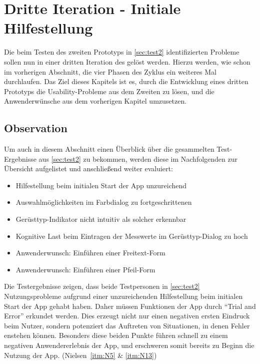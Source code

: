 \chapter{Dritte Iteration - Initiale Hilfestellung}\label{chap:pro3}
Die beim Testen des zweiten Prototyps in \autoref{sec:test2} identifizierten Probleme sollen nun in einer dritten Iteration des \hcdp{} gelöst werden.
Hierzu werden, wie schon im vorherigen Abschnitt, die vier Phasen des Zyklus ein weiteres Mal durchlaufen.
Das Ziel dieses Kapitels ist es, durch die Entwicklung eines dritten Prototyps die Usability-Probleme aus dem Zweiten zu lösen, und die Anwenderwünsche aus dem vorherigen Kapitel umzusetzen.

\section{Observation}\label{sec:obs3}
Um auch in diesem Abschnitt einen Überblick über die gesammelten Test-Ergebnisse aus \autoref{sec:test2} zu bekommen, werden diese im Nachfolgenden zur Übersicht aufgelistet und anschließend weiter evaluiert:

\begin{itemize}
  \item Hilfestellung beim initialen Start der App unzureichend
  \item Auswahlmöglichkeiten im Farbdialog zu fortgeschrittenen
  \item Gerüsttyp-Indikator nicht intuitiv als solcher erkennbar
  \item Kognitive Last beim Eintragen der Messwerte im Gerüsttyp-Dialog zu hoch
  \item Anwenderwunsch: Einführen einer Freitext-Form
  \item Anwenderwunsch: Einführen einer Pfeil-Form 
\end{itemize}

\noindent
Die Testergebnisse zeigen, dass beide Testpersonen in \autoref{sec:test2} Nutzungsprobleme aufgrund einer unzureichenden Hilfestellung beim initialen Start der App gehabt haben.
Daher müssen Funktionen der App durch ``Trial and Error'' erkundet werden.
Dies erzeugt nicht nur einen negativen ersten Eindruck beim Nutzer, sondern potenziert das Auftreten von Situationen, in denen Fehler enstehen können.
Besonders diese beiden Punkte führen schnell zu einem negativen Anwendererlebnis der App, und erschweren somit bereits zu Beginn die Nutzung der App.
(Nielsen~\autoref{itm:N5} \& \autoref{itm:N13}) \\

